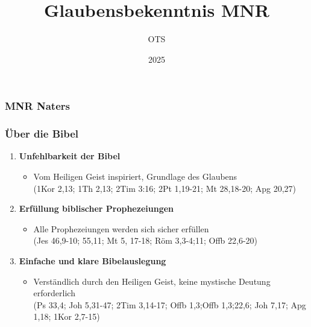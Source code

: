 \documentclass[aspectratio=43]{beamer}
\title{Glaubensbekenntnis MNR}
\author{OTS}
\date{2025}
\begin{document}
\begin{frame}
    \frametitle{MNR Naters}
    \maketitle    
\end{frame}
\begin{frame}
    \frametitle{Über die Bibel}  %
    \parbox{\textwidth}{%
        \vspace{0.55cm}
            \begin{enumerate}
                \item \textbf{Unfehlbarkeit der Bibel}
                    \begin{itemize}              
                        \item Vom Heiligen Geist inspiriert, Grundlage des Glaubens\\
                        (1Kor 2,13; 1Th 2,13; 2Tim 3:16; 2Pt 1,19-21; Mt 28,18-20; Apg 20,27)
                    \end{itemize}
                    \vspace{0.25cm}
                \item \textbf{Erfüllung biblischer Prophezeiungen}
                    \begin{itemize}
                        \item Alle Prophezeiungen werden sich sicher erfüllen\\
                        (Jes 46,9-10; 55,11; Mt 5, 17-18; Röm 3,3-4;11; Offb 22,6-20)
                    \end{itemize}
                    \vspace{0.25cm}
                \item \textbf{Einfache und klare Bibelauslegung}
                    \begin{itemize}
                        \item Verständlich durch den Heiligen Geist, keine mystische Deutung erforderlich\\
                        (Ps 33,4; Joh 5,31-47; 2Tim 3,14-17; Offb 1,3;Offb 1,3;22,6; Joh 7,17; Apg 1,18; 1Kor 2,7-15)
                    \end{itemize} 
            \end{enumerate} 
            }
\end{frame}
\end{document}
